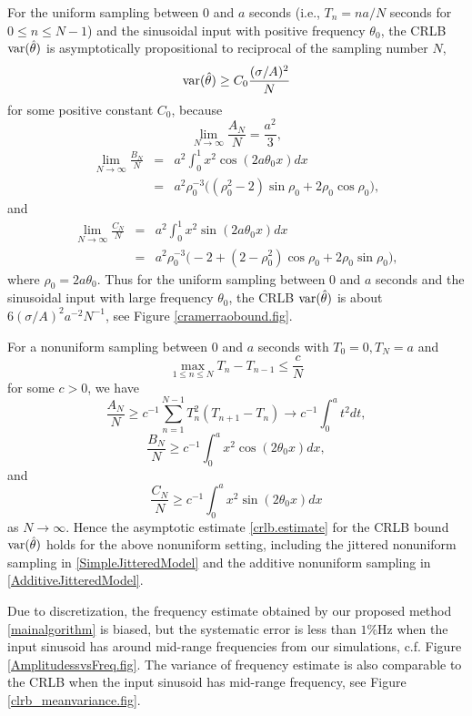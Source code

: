 \documentclass{UCF_ETD}
\begin{document}
For the uniform sampling between $0$ and $a$ seconds  (i.e., $T_n=na/N$ seconds for $0\le n\le N-1$)  and the sinusoidal input with positive frequency $\theta_0$,
the CRLB ${\rm var}(\hat{\theta})$
is asymptotically propositional to reciprocal of the sampling number $N$,
\begin{equation}\label{crlb.est1}
{\rm var}(\hat{\theta})\ge  C_0\frac{ (\sigma/A)^2}{N} \end{equation}
for some positive constant $C_0$, because
$$\lim_{N\to \infty}\frac{A_N}{N}=\frac{a^2}{3},$$
\begin{eqnarray*}\lim_{N\to \infty} \frac{B_N}{N} & = & a^2 \int_0^1 x^2 \cos(2a\theta_0 x) dx\\
&=& a^2\rho_0^{-3} \big((\rho_0^2-2) \sin \rho_0+2\rho_0 \cos \rho_0\big),\end{eqnarray*}
and
\begin{eqnarray*}
\lim_{N\to \infty}\frac{ C_N}{N} &=&a^2 \int_0^1 x^2 \sin(2a\theta_0 x) dx\\
& = & a^2\rho_0^{-3}\big(-2+(2-\rho_0^2)\cos\rho_0+2\rho_0\sin\rho_0\big),
\end{eqnarray*}
where $\rho_0=2a \theta_0$.
Thus
for the uniform sampling between $0$ and $a$ seconds  and the sinusoidal input with large frequency $\theta_0$,
the CRLB ${\rm var}(\hat{\theta})$ is about  $6(\sigma/A)^2 a^{-2}N^{-1}$, see Figure \ref{cramerraobound.fig}.

For a nonuniform sampling between $0$ and $a$ seconds  with
$T_0=0, T_N=a$ and
$$\max_{1\le n\le N} T_n-T_{n-1}\le\frac{c}{N}$$
for some $c>0$, we have
$$\frac{A_N}{N}\ge c^{-1} \sum_{n=1}^{N-1} T_n^2 (T_{n+1}-T_n)\to c^{-1}\int_0^a t^2 dt,$$
$$\frac{B_N}{N}\ge  c^{-1} \int_0^a x^2 \cos(2\theta_0 x) dx,$$
and $$ \frac{ C_N}{N} \ge c^{-1} \int_0^a x^2 \sin(2\theta_0 x) dx $$
as $N\to \infty$.  Hence the  asymptotic estimate  \eqref{crlb.estimate}  for the CRLB bound ${\rm var}(\hat{\theta})$
 holds for the above nonuniform setting, including the jittered nonuniform  sampling in \eqref{SimpleJitteredModel}
 and the additive nonuniform  sampling in  \eqref{AdditiveJitteredModel}.


Due to discretization, the frequency estimate obtained by our proposed method \eqref{mainalgorithm}
is biased, but the systematic error is less than $1\%$Hz when the input sinusoid has around mid-range frequencies
from our simulations, c.f. Figure \ref{AmplitudessvsFreq.fig}.
The variance of frequency estimate is also comparable to the
CRLB when the input sinusoid has mid-range frequency, see Figure \ref{clrb_meanvariance.fig}.
\end{document}
